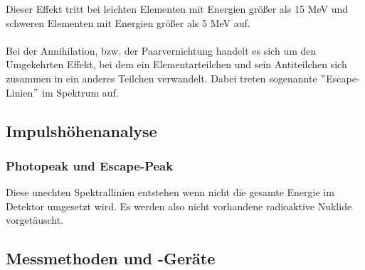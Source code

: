 Dieser Effekt tritt bei leichten Elementen mit Energien größer als 15 MeV und schweren Elementen mit Energien größer als 5 MeV auf.\\
\\
Bei der Annihilation, bzw. der Paarvernichtung handelt es sich um den Umgekehrten Effekt, bei dem ein Elementarteilchen und sein Antiteilchen sich zusammen in ein anderes Teilchen verwandelt. Dabei treten sogenannte $"$Escape-Linien$"$ im Spektrum auf. 

\subsection{Impulshöhenanalyse}
\subsubsection*{Photopeak und Escape-Peak}
Diese unechten Spektrallinien entstehen wenn nicht die gesamte Energie im Detektor umgesetzt wird. Es werden also nicht vorhandene radioaktive Nuklide vorgetäuscht.

\subsection{Messmethoden und -Geräte}